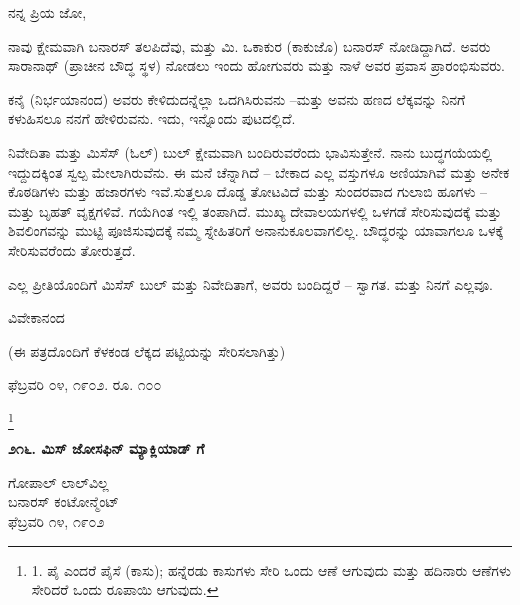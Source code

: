 ನನ್ನ ಪ್ರಿಯ ಜೋ,

ನಾವು ಕ್ಷೇಮವಾಗಿ ಬನಾರಸ್ ತಲಪಿದೆವು, ಮತ್ತು ಮಿ. ಒಕಾಕುರ (ಕಾಕುಜೊ) ಬನಾರಸ್ ನೋಡಿದ್ದಾಗಿದೆ. ಅವರು ಸಾರಾನಾಥ್ (ಪ್ರಾಚೀನ ಬೌದ್ಧ ಸ್ಥಳ) ನೋಡಲು ಇಂದು ಹೋಗುವರು ಮತ್ತು ನಾಳೆ ಅವರ ಪ್ರವಾಸ ಪ್ರಾರಂಭಿಸುವರು.

ಕನೈ (ನಿರ್ಭಯಾನಂದ) ಅವರು ಕೇಳಿದುದನ್ನೆಲ್ಲಾ ಒದಗಿಸಿರುವನು –ಮತ್ತು ಅವನು ಹಣದ ಲೆಕ್ಕವನ್ನು ನಿನಗೆ ಕಳುಹಿಸಲೂ ನನಗೆ ಹೇಳಿರುವನು. ಇದು, ಇನ್ನೊಂದು ಪುಟದಲ್ಲಿದೆ.

ನಿವೇದಿತಾ ಮತ್ತು ಮಿಸೆಸ್ (ಓಲ್) ಬುಲ್ ಕ್ಷೇಮವಾಗಿ ಬಂದಿರುವರೆಂದು ಭಾವಿಸುತ್ತೇನೆ. ನಾನು ಬುದ್ಧಗಯೆಯಲ್ಲಿ ಇದ್ದುದಕ್ಕಿಂತ ಸ್ವಲ್ಪ ಮೇಲಾಗಿರುವೆನು. ಈ ಮನೆ ಚೆನ್ನಾಗಿದೆ – ಬೇಕಾದ ಎಲ್ಲ ವಸ್ತುಗಳೂ ಅಣಿಯಾಗಿವೆ ಮತ್ತು ಅನೇಕ ಕೊಠಡಿಗಳು ಮತ್ತು ಹಜಾರಗಳು ಇವೆ.ಸುತ್ತಲೂ ದೊಡ್ಡ ತೋಟವಿದೆ ಮತ್ತು ಸುಂದರವಾದ ಗುಲಾಬಿ ಹೂಗಳು – ಮತ್ತು ಬೃಹತ್ ವೃಕ್ಷಗಳಿವೆ. ಗಯೆಗಿಂತ ಇಲ್ಲಿ ತಂಪಾಗಿದೆ. ಮುಖ್ಯ ದೇವಾಲಯಗಳಲ್ಲಿ ಒಳಗಡೆ ಸೇರಿಸುವುದಕ್ಕೆ ಮತ್ತು ಶಿವಲಿಂಗವನ್ನು ಮುಟ್ಟಿ ಪೂಜಿಸುವುದಕ್ಕೆ ನಮ್ಮ ಸ್ನೇಹಿತರಿಗೆ ಅನಾನುಕೂಲವಾಗಲಿಲ್ಲ. ಬೌದ್ಧರನ್ನು ಯಾವಾಗಲೂ ಒಳಕ್ಕೆ ಸೇರಿಸುವರೆಂದು ತೋರುತ್ತದೆ.

ಎಲ್ಲ ಪ್ರೀತಿಯೊಂದಿಗೆ ಮಿಸೆಸ್ ಬುಲ್ ಮತ್ತು ನಿವೇದಿತಾಗೆ, ಅವರು ಬಂದಿದ್ದರೆ – ಸ್ವಾಗತ. ಮತ್ತು ನಿನಗೆ ಎಲ್ಲವೂ.

\begin{flushright}
ವಿವೇಕಾನಂದ
\end{flushright}

(ಈ ಪತ್ರದೊಂದಿಗೆ ಕೆಳಕಂಡ ಲೆಕ್ಕದ ಪಟ್ಟಿಯನ್ನು ಸೇರಿಸಲಾಗಿತ್ತು)

ಫೆಬ್ರವರಿ ೦೪, ೧೯೦೨. ರೂ. ೧೦೦






\footnote{1. ಪೈ ಎಂದರೆ ಪೈಸೆ (ಕಾಸು); ಹನ್ನೆರಡು ಕಾಸುಗಳು ಸೇರಿ ಒಂದು ಆಣೆ ಆಗುವುದು ಮತ್ತು ಹದಿನಾರು ಆಣೆಗಳು ಸೇರಿದರೆ ಒಂದು ರೂಪಾಯಿ ಆಗುವುದು.}

\begin{center}
\textbf{೨೧೬. ಮಿಸ್ ಜೋಸಫಿನ್ ಮ್ಯಾಕ್ಲಿಯಾಡ್ ಗೆ}
\end{center}

\begin{flushright}
ಗೋಪಾಲ್ ಲಾಲ್‌ವಿಲ್ಲ\\ಬನಾರಸ್ ಕಂಟೋನ್ಮೆಂಟ್\\ಫೆಬ್ರವರಿ ೧೪, ೧೯೦೨
\end{flushright}

